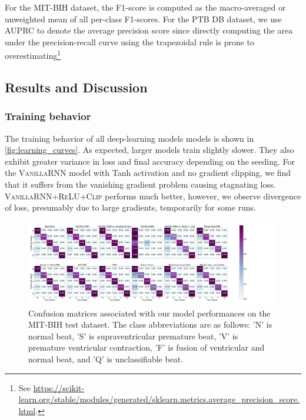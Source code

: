 For the MIT-BIH dataset, the F1-score is computed as the macro-averaged or unweighted mean of all per-class F1-scores. For the PTB DB dataset, we use AUPRC to denote the average precision score since directly computing the area under the precision-recall curve using the trapezoidal rule is prone to overestimating\footnote{See \url{https://scikit-learn.org/stable/modules/generated/sklearn.metrics.average_precision_score.html}.}



\subsection{Results and Discussion}

\subsubsection{Training behavior}
The training behavior of all deep-learning models models is shown in \autoref{fig:learning_curves}. As expected, larger models train slightly slower. They also exhibit greater variance in loss and final accuracy depending on the seeding. For the \textsc{VanillaRNN} model with Tanh activation and no gradient clipping, we find that it suffers from the vanishing gradient problem causing stagnating loss. \textsc{VanillaRNN+ReLU+Clip} performs much better, however, we observe divergence of loss, presumably due to large gradients, temporarily for some runs.

\begin{figure}[t]
    \centering
    \includegraphics[width=1\textwidth]{figures/confusion_matrices_mitbih.png}
    \caption{Confusion matrices associated with our model performances on the MIT-BIH test dataset. The class abbreviations are as follows: 'N' is normal beat, 'S' is supraventricular premature beat, 'V' is premature ventricular contraction, 'F' is fusion of ventricular and normal beat, and 'Q' is unclassifiable beat.}
    \label{fig:confusion_matrices_mitbih}
\end{figure}

